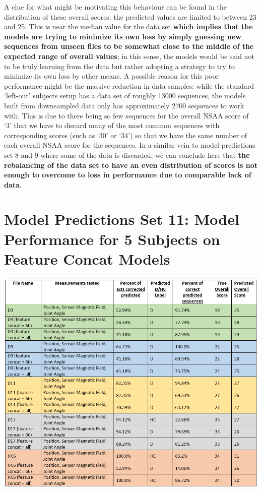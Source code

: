 \documentclass[12pt,twoside]{report}
\begin{document}
\quad A clue for what might be motivating this behaviour can be found in the distribution of these overall scores: the predicted values are limited to between 23 and 25. This is near the median value for the data set \textbf{which implies that the models are trying to minimize its own loss by simply guessing new sequences from unseen files to be somewhat close to the middle of the expected range of overall values}; in this sense, the models would be said not to be truly learning from the data but rather adopting a strategy to try to minimize its own loss by other means. A possible reason for this poor performance might be the massive reduction in data samples: while the standard ‘left-out’ subjects setup has a data set of roughly 13000 sequences, the models built from downsampled data only has approximately 2700 sequences to work with. This is due to there being so few sequences for the overall NSAA score of ‘3’ that we have to discard many of the most common sequences with corresponding scores (such as ‘30’ or ‘34’) so that we have the same number of each overall NSAA score for the sequences. In a similar vein to model predictions set 8 and 9 where some of the data is discarded, we can conclude here that \textbf{the rebalancing of the data set to have an even distribution of scores is not enough to overcome to loss in performance due to comparable lack of data}.




\section{Model Predictions Set 11: Model Performance for 5 Subjects on Feature Concat Models}

\begin{center}
\includegraphics[scale=0.5]{project_figures/fig11_18}
\end{center}
\end{document}
